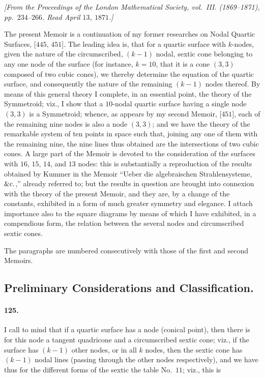 \documentclass[11pt,a4paper]{article}
\begin{document}
\begin{center}
\textit{[From the Proceedings of the London Mathematical Society, vol.\ III.
(1869--1871), pp.\ $234$--$266$. Read April $13$, $1871$.]}
\end{center}

\medskip

The present Memoir is a continuation of my former researches on Nodal
Quartic Surfaces, [$445$, $451$]. The leading idea is, that for a quartic
surface with $k$-nodes, given the nature of the circumscribed, $(k - 1)$
nodal, sextic cone belonging to any one node of the surface (for instance,
$k = 10$, that it is a cone $(3, 3)$ composed of two cubic cones), we
thereby determine the equation of the quartic surface, and consequently
the nature of the remaining $(k - 1)$ nodes thereof. By means of this
general theory I complete, in an essential point, the theory of the
Symmetroid; viz., I show that a $10$-nodal quartic surface having a single
node $(3, 3)$ is a Symmetroid; whence, as appears by my second Memoir,
[$451$], each of the remaining nine nodes is also a node $(3, 3)$; and we
have the theory of the remarkable system of ten points in space such that,
joining any one of them with the remaining nine, the nine lines thus
obtained are the intersections of two cubic cones. A large part of the
Memoir is devoted to the consideration of the surfaces with $16$, $15$,
$14$, and $13$ nodes: this is substantially a reproduction of the results
obtained by Kummer in the Memoir ``Ueber die algebraischen
Strahlensysteme, $\&{\rm c}.$,'' already referred to; but the results in
question are brought into connexion with the theory of the present Memoir,
and they are, by a change of the constants, exhibited in a form of much
greater symmetry and elegance. I attach importance also to the square
diagrams by means of which I have exhibited, in a compendious form, the
relation between the several nodes and circumscribed sextic cones.

The paragraphs are numbered consecutively with those of the first and
second Memoirs.

\subsection*{Preliminary Considerations and Classification.}

\paragraph{125.}
I call to mind that if a quartic surface has a node (conical point), then
there is for this node a tangent quadricone and a circumscribed sextic
cone; viz., if the surface has $(k - 1)$ other nodes, or in all $k$ nodes,
then the sextic cone has $(k - 1)$ nodal lines (passing through the other
nodes respectively), and we have thus for the different forms of the
sextic the table No.~$11$; viz., this is
\end{document}
